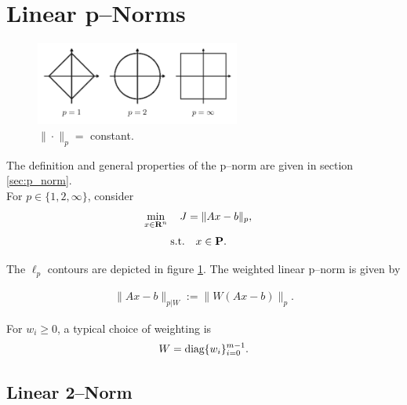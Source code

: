 \documentclass{article}
\begin{document}
\section{Linear p--Norms}
    \begin{figure}[h!]
        \centering
        \includegraphics[width=0.6\textwidth]{./figs/norm/lp.png}
        \caption{$\|\cdot\|_p = $ constant.}
        \label{fig:lp}
    \end{figure}
    The definition and general properties of the p--norm are given in section \ref{sec:p_norm}.\\ 
    For $p\in\{1,2,\infty\}$, consider 
    \begin{align}
            \min_{x\in\textbf{R}^n}
        \quad
            J
        &=
            \|A x - b \|_p,
    \end{align}
    \begin{align*}
        \text{s.t.}\quad&x\in\textbf{P}.
    \end{align*}

    The $\ell_p$ contours are depicted in figure \ref{fig:lp}.
    The weighted linear p--norm is given by

    \begin{align}
        \|Ax-b\|_{p|W}:=\|W(Ax-b)\|_p.
    \end{align}

    For $w_i\geq0$, a typical choice of weighting is
    \begin{align*}
        W=\text{diag}\{w_i\}_{i=0}^{m-1}.
    \end{align*}

\subsection{Linear 2--Norm}
\end{document}
